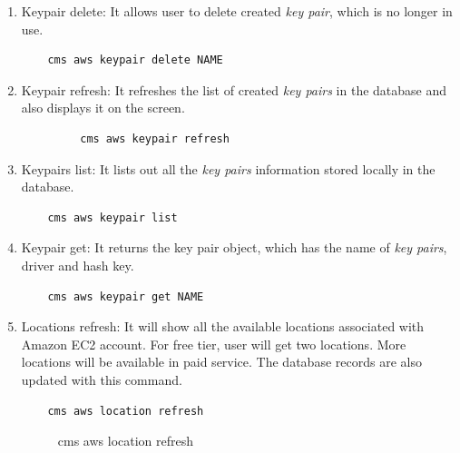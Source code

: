 \documentclass[9pt,twocolumn,twoside]{../../styles/osajnl}
\begin{document}
\begin{enumerate}
    \item Keypair delete: It allows user to delete created \textit{key pair}, which is no longer in use.
    
    \begin{verbatim}
    cms aws keypair delete NAME
    \end{verbatim}
    
    \item Keypair refresh: It refreshes the list of created \textit{key pairs} in the database and also displays it on the screen.
    
    \begin{verbatim}
	     cms aws keypair refresh
    \end{verbatim}
    
    \item Keypairs list: It lists out all the \textit{key pairs} information stored locally in the database.
           
    \begin{verbatim}
    cms aws keypair list
    \end{verbatim}
    
    \item Keypair get: It returns the key pair object, which has the name of \textit{key pairs}, driver and hash key.
    
    \begin{verbatim}
    cms aws keypair get NAME
    \end{verbatim}
    
    
    \item Locations refresh: It will show all the available locations associated with Amazon EC2 account. For free tier, user will get two locations. More locations will be available in paid service. The database records are also updated with this command.
    
    \begin{verbatim}
    cms aws location refresh
    \end{verbatim}
    
    \begin{figure}[h!]
    	\centering
    	\caption{cms aws location refresh}
    	\label{fig:locationlist}
    \end{figure}



\end{enumerate}
\end{document}
